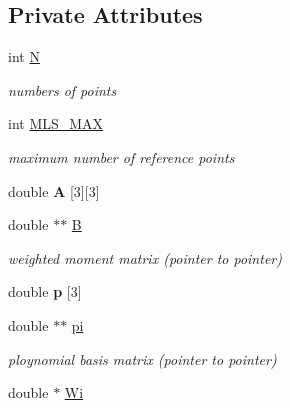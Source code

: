 \subsection*{Private Attributes}
\begin{CompactItemize}
\item 
\hypertarget{classMLS_2a4087a4494f44c3876144093a355b5f}{
int \hyperlink{classMLS_2a4087a4494f44c3876144093a355b5f}{N}}
\label{classMLS_2a4087a4494f44c3876144093a355b5f}

\begin{CompactList}\small\item\em numbers of points \item\end{CompactList}\item 
\hypertarget{classMLS_b610a9eb7b7df89432454f08ad98c9b0}{
int \hyperlink{classMLS_b610a9eb7b7df89432454f08ad98c9b0}{MLS\_\-MAX}}
\label{classMLS_b610a9eb7b7df89432454f08ad98c9b0}

\begin{CompactList}\small\item\em maximum number of reference points \item\end{CompactList}\item 
\hypertarget{classMLS_9499afde579c88688a27973bde8b4183}{
double \textbf{A} \mbox{[}3\mbox{]}\mbox{[}3\mbox{]}}
\label{classMLS_9499afde579c88688a27973bde8b4183}

\item 
\hypertarget{classMLS_ecdcd478c6683a0a865ef4db7385d77a}{
double $\ast$$\ast$ \hyperlink{classMLS_ecdcd478c6683a0a865ef4db7385d77a}{B}}
\label{classMLS_ecdcd478c6683a0a865ef4db7385d77a}

\begin{CompactList}\small\item\em weighted moment matrix (pointer to pointer) \item\end{CompactList}\item 
\hypertarget{classMLS_871ec34ef81919130fa552b982324a40}{
double \textbf{p} \mbox{[}3\mbox{]}}
\label{classMLS_871ec34ef81919130fa552b982324a40}

\item 
\hypertarget{classMLS_71607b0dededb152f2c75a767b84ffb8}{
double $\ast$$\ast$ \hyperlink{classMLS_71607b0dededb152f2c75a767b84ffb8}{pi}}
\label{classMLS_71607b0dededb152f2c75a767b84ffb8}

\begin{CompactList}\small\item\em ploynomial basis matrix (pointer to pointer) \item\end{CompactList}\item 
\hypertarget{classMLS_78d2e05f618cac0c7a8ca0ddef8c21c8}{
double $\ast$ \hyperlink{classMLS_78d2e05f618cac0c7a8ca0ddef8c21c8}{Wi}}
\label{classMLS_78d2e05f618cac0c7a8ca0ddef8c21c8}


\end{CompactItemize}
